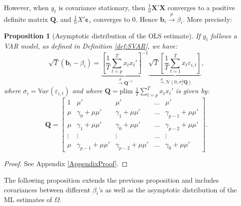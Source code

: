 \documentclass[
  11pt,
]{book}
\newtheorem{proposition}{Proposition}[chapter]
\theoremstyle{definition}
\theoremstyle{definition}
\theoremstyle{definition}
\theoremstyle{definition}
\theoremstyle{remark}
\begin{document}
However, when \(y_t\) is covariance stationary, then \(\frac{1}{n}\mathbf{X}'\mathbf{X}\) converges to a positive definite matrix \(\mathbf{Q}\), and \(\frac{1}{n}X'\boldsymbol\varepsilon_i\) converges to 0. Hence \(\mathbf{b}_i \overset{p}{\rightarrow} \beta_i\). More precisely:

\begin{proposition}[Asymptotic distribution of the OLS estimate]
\protect\hypertarget{prp:OLSVAR}{}\label{prp:OLSVAR}If \(y_t\) follows a VAR model, as defined in Definition \ref{def:SVAR}, we have:
\[
\sqrt{T}(\mathbf{b}_i-\beta_i) =  \underbrace{\left[\frac{1}{T}\sum_{t=p}^T x_t x_t' \right]^{-1}}_{\overset{p}{\rightarrow} \mathbf{Q}^{-1}}
\underbrace{\sqrt{T} \left[\frac{1}{T}\sum_{t=1}^T x_t\varepsilon_{i,t} \right]}_{\overset{d}{\rightarrow} \mathcal{N}(0,\sigma_i^2\mathbf{Q})},
\]
where \(\sigma_i = \mathbb{V}ar(\varepsilon_{i,t})\) and where \(\mathbf{Q} = \mbox{plim }\frac{1}{T}\sum_{t=p}^T x_t x_t'\) is given by:
\begin{equation}
\mathbf{Q} = \left[
\begin{array}{ccccc}
1 & \mu' &\mu' & \dots & \mu' \\
\mu & \gamma_0 + \mu\mu' & \gamma_1 + \mu\mu' & \dots & \gamma_{p-1} + \mu\mu'\\
\mu & \gamma_1 + \mu\mu' & \gamma_0 + \mu\mu' & \dots & \gamma_{p-2} + \mu\mu'\\
\vdots &\vdots &\vdots &\dots &\vdots \\
\mu & \gamma_{p-1} + \mu\mu' & \gamma_{p-2} + \mu\mu' & \dots & \gamma_{0} + \mu\mu'
\end{array}
\right].\label{eq:QolsVAR}
\end{equation}
\end{proposition}

\begin{proof}
See Appendix \ref{AppendixProof}.
\end{proof}

The following proposition extends the previous proposition and includes covariances between different \(\beta_i\)'s as well as the asymptotic distribution of the ML estimates of \(\Omega\).
\end{document}
